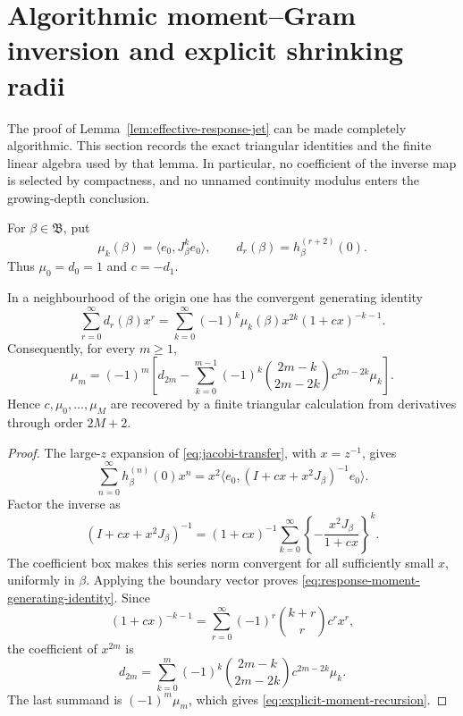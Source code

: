 
\section{Algorithmic moment--Gram inversion and explicit shrinking radii}
\label{sec:effective-inversion-details}

The proof of Lemma~\ref{lem:effective-response-jet} can be made completely
algorithmic.  This section records the exact triangular identities and the
finite linear algebra used by that lemma.  In particular, no coefficient of
the inverse map is selected by compactness, and no unnamed continuity modulus
enters the growing-depth conclusion.

For \(\beta\in\mathfrak B\), put
\[
 \mu_k(\beta)=\langle e_0,J_\beta^ke_0\rangle,
 \qquad d_r(\beta)=h_\beta^{(r+2)}(0).
\]
Thus \(\mu_0=d_0=1\) and \(c=-d_1\).

\begin{lemma}
\label{lem:response-moment-triangularity}
In a neighbourhood of the origin one has the convergent generating identity
\begin{equation}
 \sum_{r=0}^{\infty}d_r(\beta)x^r
 =\sum_{k=0}^{\infty}(-1)^k\mu_k(\beta)x^{2k}
       (1+cx)^{-k-1}.
 \label{eq:response-moment-generating-identity}
\end{equation}
Consequently, for every \(m\ge1\),
\begin{equation}
 \mu_m=(-1)^m\left[
 d_{2m}-\sum_{k=0}^{m-1}(-1)^k
 \binom{2m-k}{2m-2k}c^{2m-2k}\mu_k
 \right].
 \label{eq:explicit-moment-recursion}
\end{equation}
Hence \(c,\mu_0,\ldots,\mu_M\) are recovered by a finite triangular
calculation from derivatives through order \(2M+2\).
\end{lemma}

\begin{proof}
The large-\(z\) expansion of \eqref{eq:jacobi-transfer}, with \(x=z^{-1}\),
gives
\[
 \sum_{n=0}^{\infty}h_\beta^{(n)}(0)x^n
 =x^2\langle e_0,(I+cx+x^2J_\beta)^{-1}e_0\rangle.
\]
Factor the inverse as
\[
 (I+cx+x^2J_\beta)^{-1}
 =(1+cx)^{-1}\sum_{k=0}^{\infty}
 \left\{-\frac{x^2J_\beta}{1+cx}\right\}^k.
\]
The coefficient box makes this series norm convergent for all sufficiently
small \(x\), uniformly in \(\beta\).  Applying the boundary vector proves
\eqref{eq:response-moment-generating-identity}.  Since
\[
 (1+cx)^{-k-1}=\sum_{r=0}^{\infty}
 (-1)^r\binom{k+r}{r}c^rx^r,
\]
the coefficient of \(x^{2m}\) is
\[
 d_{2m}=\sum_{k=0}^{m}(-1)^k
 \binom{2m-k}{2m-2k}c^{2m-2k}\mu_k.
\]
The last summand is \((-1)^m\mu_m\), which gives
\eqref{eq:explicit-moment-recursion}.
\end{proof}

